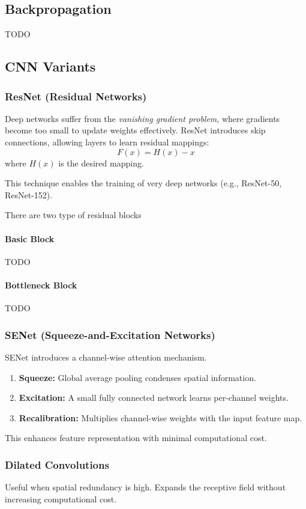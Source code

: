 \documentclass{article}
\begin{document}
\subsection{Backpropagation}
TODO

\subsection{CNN Variants}

\subsubsection{ResNet (Residual Networks)}
Deep networks suffer from the \textit{vanishing gradient problem}, where gradients become too small to update weights effectively. ResNet introduces skip connections, allowing layers to learn residual mappings:
\[
F(x) = H(x) - x
\]
where $H(x)$ is the desired mapping.

This technique enables the training of very deep networks (e.g., ResNet-50, ResNet-152).

There are two type of residual blocks

\paragraph{Basic Block} TODO
\paragraph{Bottleneck Block} TODO

\subsubsection{SENet (Squeeze-and-Excitation Networks)}
SENet introduces a channel-wise attention mechanism.
\begin{enumerate}
    \item \textbf{Squeeze:} Global average pooling condenses spatial information.
    \item \textbf{Excitation:} A small fully connected network learns per-channel weights.
    \item \textbf{Recalibration:} Multiplies channel-wise weights with the input feature map.
\end{enumerate}
This enhances feature representation with minimal computational cost.

\subsubsection{Dilated Convolutions}
Useful when spatial redundancy is high. Expands the receptive field without increasing computational cost.
\end{document}
